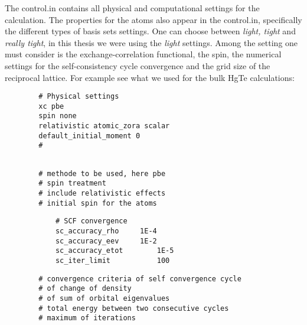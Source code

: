	The control.in contains all physical and computational settings for the calculation. The properties for the atoms also appear in the control.in, specifically the different types of basis sets settings.
	One can choose between \textit{light, tight} and \textit{really tight}, in this thesis we were using the \textit{light} settings.
	Among the setting one must consider is the exchange-correlation functional, the spin, the numerical settings for the self-consistency cycle convergence and the grid size of the reciprocal lattice. For example see what we used for the bulk HgTe calculations:
	\\
	\begin{minipage}[c]{0.45\linewidth}	\vspace{15pt}
		\begin{verbatim}
		# Physical settings
		xc pbe
		spin none
		relativistic atomic_zora scalar
		default_initial_moment 0
		#
		\end{verbatim} 
	\end{minipage}
	\begin{minipage}[c]{0.55\linewidth} \vspace{11pt}
		\begin{verbatim}
		
		# methode to be used, here pbe
		# spin treatment
		# include relativistic effects
		# initial spin for the atoms
		\end{verbatim}
	\end{minipage} 
	\begin{minipage}[c]{0.3\linewidth} \vspace{0.2cm}
		\begin{verbatim} 
			# SCF convergence
			sc_accuracy_rho		1E-4
			sc_accuracy_eev		1E-2
			sc_accuracy_etot		1E-5
			sc_iter_limit			100	
		\end{verbatim}
	\end{minipage} 
	\hfill
	\begin{minipage}[c]{0.7\linewidth} \vspace{0.15cm}
		\begin{verbatim}
		# convergence criteria of self convergence cycle
		# of change of density
		# of sum of orbital eigenvalues
		# total energy between two consecutive cycles
		# maximum of iterations
		\end{verbatim}
	\end{minipage} 

